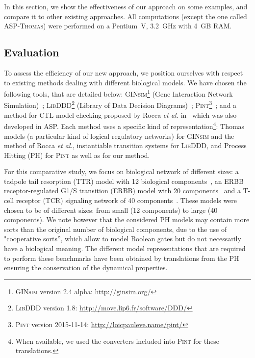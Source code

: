 In this section, we show the effectiveness of our approach on some examples,
and compare it to other existing approaches.
All computations (except the one called \textsc{ASP-Thomas}) were performed on a Pentium~V, 3.2~GHz with 4~GB RAM.

\subsection{Evaluation}
To assess the efficiency of our new approach,
we position ourselves with respect to existing methods dealing with different biological models.
We have chosen the following tools, that are detailed below: 
\textsc{GINsim}\footnote{\textsc{GINsim} version 2.4 alpha: \url{http://ginsim.org/}} (Gene Interaction Network Simulation)~\cite{gonzalez2006ginsim,naldi2009logical,naldi2007decision};
\textsc{LibDDD}\footnote{\textsc{LibDDD} version 1.8: \url{http://move.lip6.fr/software/DDD/}}
(Library of Data Decision Diagrams)~\cite{thierry2009hierarchical,colange2013towards};
\textsc{Pint}\footnote{\textsc{Pint} version 2015-11-14: \url{http://loicpauleve.name/pint/}}~\cite{PMR12-MSCS};
and a method for CTL model-checking proposed by Rocca \textit{et al.} in~\cite{roccaasp}
which was also developed in ASP.
Each method uses a specific kind of representation\footnote{When available, we used the converters included into \textsc{Pint} for these translations.}:
Thomas models (a particular kind of logical regulatory networks) for \textsc{GINsim}
and the method of Rocca \textit{et al.},
instantiable transition systems for \textsc{LibDDD},
and Process Hitting (PH) for \textsc{Pint} as well as for our method.

For this comparative study, we focus on biological network of different sizes:
a tadpole tail resorption (TTR) model with 12 biological components~\cite{khalis2009smbionet},
an ERBB receptor-regulated G1/S transition (ERBB) model with 20 components~\cite{Samaga2009}
and a T-cell receptor (TCR) signaling network of 40 components~\cite{Klamt06}.
These models were chosen to be of different sizes:
from small (12 components) to large (40 components).
We note however that the considered PH models may contain more sorts than
the original number of biological components, due to the use of
"cooperative sorts'', which allow to model Boolean gates but do not necessarily
have a biological meaning.
The different model representations that are required to perform these benchmarks have been obtained by translations
from the PH
ensuring the conservation of the dynamical properties.

